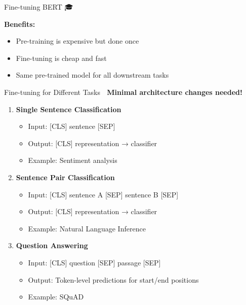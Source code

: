 \documentclass[aspectratio=169]{beamer}
\begin{document}
\begin{frame}[shrink=5]{Fine-tuning BERT 🎓}
\vspace{1em}

\textbf{Benefits:}
\begin{itemize}\setlength{\itemsep}{0pt}
    \item Pre-training is expensive but done once
    \item Fine-tuning is cheap and fast
    \item Same pre-trained model for all downstream tasks
\end{itemize}
\end{frame}

\begin{frame}[shrink=10]{Fine-tuning for Different Tasks 🎯}
\textbf{Minimal architecture changes needed!}

\vspace{1em}

\begin{enumerate}\setlength{\itemsep}{0pt}
    \item \textbf{Single Sentence Classification}
    \begin{itemize}\setlength{\itemsep}{0pt}
        \item Input: [CLS] sentence [SEP]
        \item Output: [CLS] representation → classifier
        \item Example: Sentiment analysis
    \end{itemize}

    \item \textbf{Sentence Pair Classification}
    \begin{itemize}\setlength{\itemsep}{0pt}
        \item Input: [CLS] sentence A [SEP] sentence B [SEP]
        \item Output: [CLS] representation → classifier
        \item Example: Natural Language Inference
    \end{itemize}

    \item \textbf{Question Answering}
    \begin{itemize}\setlength{\itemsep}{0pt}
        \item Input: [CLS] question [SEP] passage [SEP]
        \item Output: Token-level predictions for start/end positions
        \item Example: SQuAD
    \end{itemize}


\end{enumerate}
\end{frame}
\end{document}

